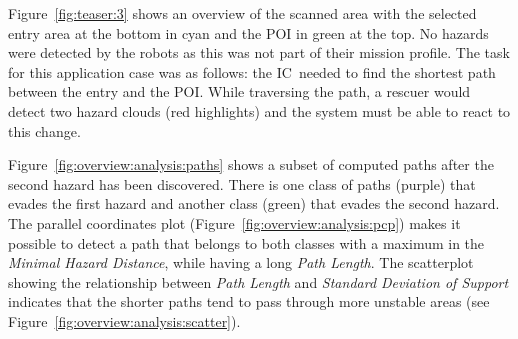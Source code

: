 \documentclass{egpubl}
\def\IC{IC}
\begin{document}
Figure~\ref{fig:teaser:3} shows an overview of the scanned area with the selected entry area at the bottom in cyan and the POI in green at the top. No hazards were detected by the robots as this was not part of their mission profile. The task for this application case was as follows: the \IC\ needed to find the shortest path between the entry and the POI. While traversing the path, a rescuer would detect two hazard clouds (red highlights) and the system must be able to react to this change.

Figure~\ref{fig:overview:analysis:paths} shows a subset of computed paths after the second hazard has been discovered. There is one class of paths (purple) that evades the first hazard and another class (green) that evades the second hazard. The parallel coordinates plot (Figure~\ref{fig:overview:analysis:pcp}) makes it possible to detect a path that belongs to both classes with a maximum in the \emph{Minimal Hazard Distance}, while having a long \emph{Path Length}. The scatterplot showing the relationship between \emph{Path Length} and \emph{Standard Deviation of Support} indicates that the shorter paths tend to pass through more unstable areas (see Figure~\ref{fig:overview:analysis:scatter}).

\end{document}
